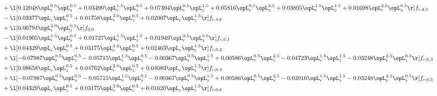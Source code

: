 \begin{alignat}{2}
& + \l[  0.12048 \opL_r^{0.5} \opL_z^{0.5} +  0.03490 \opL_r^{1.5} \opL_z^{0.5} +  0.07394 \opL_r^{0.5} \opL_z^{1.5} +  0.05816 \opL_r^{0.5} \opL_z^{2.5} +  0.03895 \opL_r^{1.5} \opL_z^{1.5} +  0.01698 \opL_r^{2.5} \opL_z^{0.5}  \r] f_{c,4,5} \nonumber \\ 
& - \l[  0.03377 \opL_r \opL_z^{0.5} +  0.01758 \opL_r^{2.0} \opL_z^{0.5} +  0.02007 \opL_r \opL_z^{1.5}  \r] f_{c,4,6} \nonumber \\ 
& + \l[  0.00794 \opL_r^{2.0} \opL_z^{0.5}  \r] f_{6,0} \nonumber \\ 
& - \l[  0.01905 \opL_r^{1.5} \opL_z^{0.5} +  0.01727 \opL_r^{1.5} \opL_z^{1.5} +  0.01949 \opL_r^{2.5} \opL_z^{0.5}  \r] f_{c,6,1} \nonumber \\ 
& + \l[  0.04329 \opL_r \opL_z^{0.5} +  0.03175 \opL_r^{2.0} \opL_z^{0.5} +  0.02463 \opL_r \opL_z^{1.5}  \r] f_{c,6,2} \nonumber \\ 
& + \l[  -0.07987 \opL_r^{0.5} \opL_z^{0.5}   -0.05715 \opL_r^{1.5} \opL_z^{0.5}   -0.00367 \opL_r^{0.5} \opL_z^{1.5} +  0.00586 \opL_r^{0.5} \opL_z^{2.5}   -0.04723 \opL_r^{1.5} \opL_z^{1.5}   -0.03248 \opL_r^{2.5} \opL_z^{0.5}  \r] f_{c,6,3} \nonumber \\ 
& + \l[  0.08658 \opL_r \opL_z^{0.5} +  0.04762 \opL_r^{2.0} \opL_z^{0.5} +  0.04083 \opL_r \opL_z^{1.5}  \r] f_{c,6,4} \nonumber \\ 
& + \l[  -0.07987 \opL_r^{0.5} \opL_z^{0.5}   -0.05715 \opL_r^{1.5} \opL_z^{0.5}   -0.00367 \opL_r^{0.5} \opL_z^{1.5} +  0.00586 \opL_r^{0.5} \opL_z^{2.5}   -0.03916 \opL_r^{1.5} \opL_z^{1.5}   -0.03248 \opL_r^{2.5} \opL_z^{0.5}  \r] f_{c,6,5} \nonumber \\ 
& + \l[  0.04329 \opL_r \opL_z^{0.5} +  0.03175 \opL_r^{2.0} \opL_z^{0.5} +  0.01620 \opL_r \opL_z^{1.5}  \r] f_{c,6,6} \nonumber \\ 
\end{alignat} 


